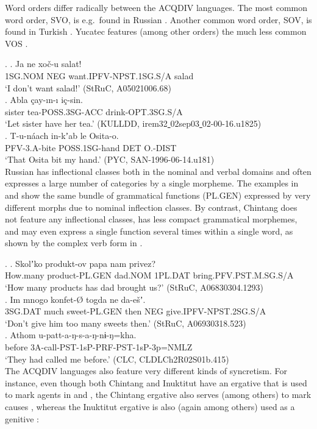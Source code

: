 \documentclass[a4paper, 11pt]{book}
\newcommand{\source}[1]{\hfill (#1)\\[-0.2cm]}	%
\newcommand{\und}{\underline{{ }}\hspace{0.2mm}}	%
\begin{document}
Word orders differ radically between the ACQDIV languages. The most common word order, SVO, is e.g.\ found in Russian \Next[a]. Another common word order, SOV, is found in Turkish \Next[b]. Yucatec features (among other orders) the much less common VOS \Next[c].

\ex.
	\ag. Ja ne xoč-u salat! \\
		1SG.NOM NEG want.IPFV-NPST.1SG.S/A salad \\
		‘I don’t want salad!’ \source{StRuC, A05021006.68}
	\bg. Abla çay-ın-ı iç-sin. \\
		sister tea-POSS.3SG-ACC drink-OPT.3SG.S/A \\
		‘Let sister have her tea.’ \source{KULLDD, irem32\und 02sep03\und 02-00-16.u1825}
	\cg. T-u-náach in-kʼab le Osita-o. \\
		PFV-3.A-bite POSS.1SG-hand DET O.-DIST \\
		‘That Osita bit my hand.’ \source{PYC, SAN-1996-06-14.u181}


Russian has inflectional classes both in the nominal and verbal domains and often expresses a large number of categories by a single morpheme. The examples in \Next[a] and \Next[b] show the same bundle of grammatical functions (PL.GEN) expressed by very different morphs due to nominal inflection classes. By contrast, Chintang does not feature any inflectional classes, has less compact grammatical morphemes, and may even express a single function several times within a single word, as shown by the complex verb form in \Next[c]. 

\ex.
	\ag. Skolʼko produkt-ov papa nam privez? \\
		How.many product-PL.GEN dad.NOM 1PL.DAT bring.PFV.PST.M.SG.S/A \\
		‘How many products has dad brought us?’ \source{StRuC, A06830304.1293}
	\bg. Im mnogo konfet-Ø togda ne da-ešʼ. \\
		3SG.DAT much sweet-PL.GEN then NEG give.IPFV-NPST.2SG.S/A \\
		‘Don’t give him too many sweets then.’ \source{StRuC, A06930318.523}
	\cg. Athom u-patt-a-ŋ-s-a-ŋ-nɨ-ŋ=kha. \\
		before 3A-call-PST-1sP-PRF-PST-1sP-3p=NMLZ \\
		‘They had called me before.’ \source{CLC, CLDLCh2R02S01b.415}


The ACQDIV languages also feature very different kinds of syncretism. For instance, even though both Chintang and Inuktitut have an ergative that is used to mark agents in \Next[a] and \NNext[a], the Chintang ergative also serves (among others) to mark causes \Next[b], whereas the Inuktitut ergative is also (again among others) used as a genitive \NNext[b]:
\end{document}
